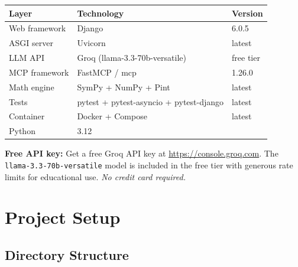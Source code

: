 \documentclass[11pt,a4paper]{article}
\begin{document}
\begin{center}
\begin{tabularx}{\linewidth}{lXl}
\toprule
\textbf{Layer} & \textbf{Technology} & \textbf{Version} \\
\midrule
Web framework  & Django              & 6.0.5 \\
ASGI server    & Uvicorn             & latest \\
LLM API        & Groq (llama-3.3-70b-versatile) & free tier \\
MCP framework  & FastMCP / mcp       & 1.26.0 \\
Math engine    & SymPy + NumPy + Pint & latest \\
Tests          & pytest + pytest-asyncio + pytest-django & latest \\
Container      & Docker + Compose    & latest \\
Python         & 3.12                & \\
\bottomrule
\end{tabularx}
\end{center}

\begin{infobox}
\textbf{Free API key:} Get a free Groq API key at \url{https://console.groq.com}.
The \texttt{llama-3.3-70b-versatile} model is included in the free tier with generous
rate limits for educational use. \emph{No credit card required.}
\end{infobox}

\newpage
\section{Project Setup}

\subsection{Directory Structure}
\end{document}
